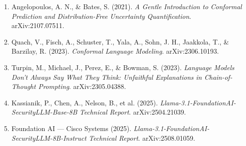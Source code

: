 \documentclass[11pt]{article}
\begin{document}
\begin{enumerate}[leftmargin=1.6cm]
\item Angelopoulos, A. N., \& Bates, S. (2021). \emph{A Gentle Introduction to Conformal Prediction and Distribution-Free Uncertainty Quantification}. arXiv:2107.07511.
\item Quach, V., Fisch, A., Schuster, T., Yala, A., Sohn, J. H., Jaakkola, T., \& Barzilay, R. (2023). \emph{Conformal Language Modeling}. arXiv:2306.10193.
\item Turpin, M., Michael, J., Perez, E., \& Bowman, S. (2023). \emph{Language Models Don't Always Say What They Think: Unfaithful Explanations in Chain-of-Thought Prompting}. arXiv:2305.04388.
\item Kassianik, P., Chen, A., Nelson, B., et al. (2025). \emph{Llama-3.1-FoundationAI-SecurityLLM-Base-8B Technical Report}. arXiv:2504.21039.
\item Foundation AI --- Cisco Systems (2025). \emph{Llama-3.1-FoundationAI-SecurityLLM-8B-Instruct Technical Report}. arXiv:2508.01059.
\end{enumerate}
\end{document}
